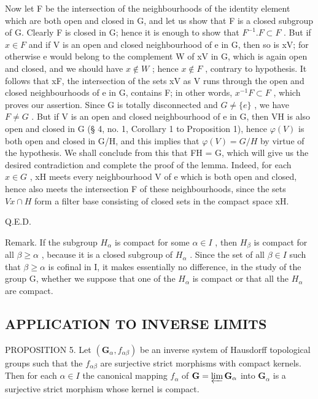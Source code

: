 Now let F be the intersection of the neighbourhoods of the identity element which are both open and closed in G, and let us show that F is a closed subgroup of G. Clearly F is closed in G; hence it is enough to show that \(F^{-1}.F \subset F\) . But if \(x \in F\) and if V is an open and closed neighbourhood of e in G, then so is xV; for otherwise e would belong to the complement W of xV in G, which is again open and closed, and we should have \(x \notin W\) ; hence \(x \notin F\) , contrary to hypothesis. It follows that xF, the intersection of the sets xV as V runs through the open and closed neighbourhoods of e in G, contains F; in other words, \(x^{-1}F \subset F\) , which proves our assertion. Since G is totally disconnected and \(G \neq \{e\}\) , we have \(F \neq G\) . But if V is an open and closed neighbourhood of e in G, then VH is also open and closed in G (§ 4, no. 1, Corollary 1 to Proposition 1), hence \(\varphi(V)\) is both open and closed in G/H, and this implies that \(\varphi(V) = G/H\) by virtue of the hypothesis. We shall conclude from this that FH = G, which will give us the desired contradiction and complete the proof of the lemma. Indeed, for each \(x \in G\) , xH meets every neighbourhood V of e which is both open and closed, hence also meets the intersection F of these neighbourhoods, since the sets \(Vx \cap H\) form a filter base consisting of closed sets in the compact space xH.

Q.E.D.

Remark. If the subgroup \(H_{\alpha}\) is compact for some \(\alpha \in I\) , then \(H_{\beta}\) is compact for all \(\beta \geqslant \alpha\) , because it is a closed subgroup of \(H_{\alpha}\) . Since the set of all \(\beta \in I\) such that \(\beta \geqslant \alpha\) is cofinal in I, it makes essentially no difference, in the study of the group G, whether we suppose that one of the \(H_{\alpha}\) is compact or that all the \(H_{\alpha}\) are compact.

\subsection{APPLICATION TO INVERSE LIMITS}

PROPOSITION 5. Let \((\mathbf{G}_{\alpha}, f_{\alpha \beta})\) be an inverse system of Hausdorff topological groups such that the \(f_{\alpha \beta}\) are surjective strict morphisms with compact kernels. Then for each \(\alpha \in I\) the canonical mapping \(f_{\alpha}\) of \(\mathbf{G} = \varprojlim \mathbf{G}_{\alpha}\) into \(\mathbf{G}_{\alpha}\) is a surjective strict morphism whose kernel is compact.

